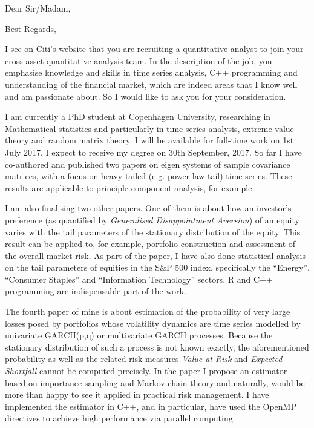 \documentclass[10pt,a4paper, gentium]{moderncv}        %
\begin{document}
\date{\today}
\opening{Dear Sir/Madam,}
\closing{Best Regards,}
\makelettertitle

I see on Citi's website that you are recruiting a quantitative
analyst to join your cross asset quantitative analysis team. In the
description of the job, you emphasise knowledge and skills in time
series analysis, C++ programming and understanding of the financial
market, which are indeed areas that I know well and am passionate
about. So I would like to ask you for your consideration.

I am currently a PhD student at Copenhagen University, researching in
Mathematical statistics and particularly in time series analysis,
extreme value theory and random matrix theory. I will be available for
full-time work on 1st July 2017. I expect to receive my degree on 30th
September, 2017. So far I have co-authored and published two papers on
eigen systems of sample covariance matrices, with a focus on
heavy-tailed (e.g. power-law tail) time series. These results are
applicable to principle component analysis, for example.

I am also finalising two other papers. One of them is about how an
investor's preference (as quantified by {\em Generalised
  Disappointment Aversion}) of an equity varies with the tail
parameters of the stationary distribution of the equity. This
result can be applied to, for example, portfolio construction and
assessment of the overall market risk. As part of the paper, I have
also done statistical analysis on the tail parameters of equities in
the S\&P 500 index, specifically the ``Energy'', ``Consumer Staples''
and ``Information Technology'' sectors. R and C++ programming are
indispensable part of the work.

The fourth paper of mine is about estimation of the probability of very
large losses posed by portfolios whose volatility dynamics are
time series modelled by univariate GARCH(p,q) or multivariate
GARCH processes. Because the stationary distribution of such a process
is not known exactly, the aforementioned probability as well as the
related risk measures {\em Value at Risk} and {\em Expected
  Shortfall} cannot be computed precisely. In the paper I propose 
an estimator based on importance sampling and Markov chain theory and
naturally, would be more than happy to see it applied in practical
risk management. I have implemented the estimator in C++, and in
particular, have used the OpenMP directives to achieve high
performance via parallel computing.
\end{document}

